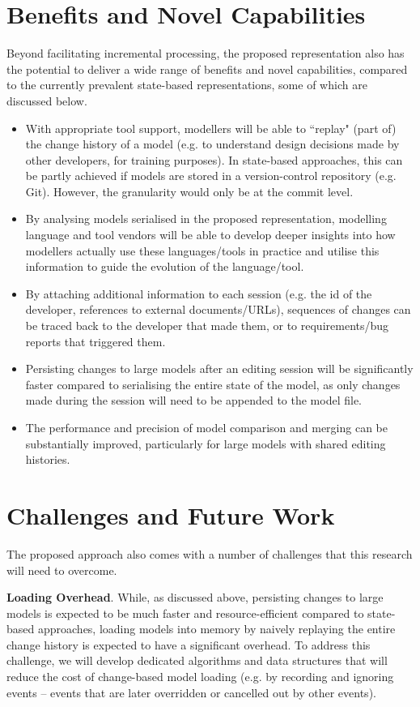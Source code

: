 \documentclass[conference]{IEEEtran}
\begin{document}
\section{Benefits and Novel Capabilities}
\label{sec:benefits_and_novel_capabilities}
Beyond facilitating incremental processing, the proposed representation also has the potential to deliver a wide range of benefits and novel capabilities, compared to the currently prevalent state-based representations, some of which are discussed below.

\begin{itemize}
\item With appropriate tool support, modellers will be able to ``replay" (part of) the change history of a model (e.g. to understand design decisions made by other developers, for training purposes). In state-based approaches, this can be partly achieved if models are stored in a version-control repository (e.g. Git). However, the granularity would only be at the commit level.
\item By analysing models serialised in the proposed representation, modelling language and tool vendors will be able to develop deeper insights into how modellers actually use these languages/tools in practice and utilise this information to guide the evolution of the language/tool.
\item By attaching additional information to each session (e.g. the id of the developer, references to external documents/URLs), sequences of changes can be traced back to the developer that made them, or to requirements/bug reports that triggered them.
\item Persisting changes to large models after an editing session will be significantly faster compared to serialising the entire state of the model, as only changes made during the session will need to be appended to the model file.
\item The performance and precision of model comparison and merging can be substantially improved, particularly for large models with shared editing histories.
\end{itemize}

\section{Challenges and Future Work}
\label{sec:challenges_and_future_works}
The proposed approach also comes with a number of challenges that this research will need to overcome.

\textbf{Loading Overhead}. While, as discussed above, persisting changes to large models is expected to be much faster and resource-efficient compared to state-based approaches, loading models into memory by naively replaying the entire change history is expected to have a significant overhead. To address this challenge, we will develop dedicated algorithms and data structures that will reduce the cost of change-based model loading (e.g. by recording and ignoring events -- events that are later overridden or cancelled out by other events). 
\end{document}
